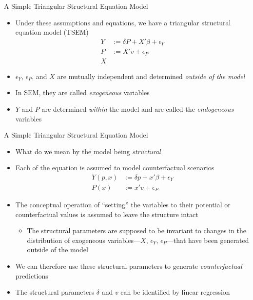\documentclass[aspectratio=1610,12pt,xcolor=dvipsnames]{beamer}
\begin{document}
\begin{frame}{A Simple Triangular Structural Equation Model}
    \begin{itemize}
        \item Under these assumptions and equations, we have a triangular structural equation model (TSEM)
        \begin{align*}
            Y &:= \delta P + X'\beta + \epsilon_Y \\
            P &:= X' v + \epsilon_P \\
            X
        \end{align*}
        \item $\epsilon_Y$, $\epsilon_P$, and $X$ are mutually independent and determined \textit{outside of the model}
        \item In SEM, they are called \textit{exogeneous} variables
        \item $Y$ and $P$ are determined \textit{within} the model and are called the \textit{endogeneous} variables
    \end{itemize}
\end{frame}

\begin{frame}{A Simple Triangular Structural Equation Model}
    \begin{itemize}
        \item What do we mean by the model being \textit{structural}
        \item Each of the equation is assumed to model counterfactual scenarios
        \begin{align*}
            Y(p,x) &:= \delta p + x'\beta + \epsilon_Y \\
            P(x) &:= x' v + \epsilon_P
        \end{align*}
        \item The conceptual operation of ``setting'' the variables to their potential or counterfactual values is assumed to leave the structure intact
        \begin{itemize}
            \item The structural parameters are supposed to be invariant to changes in the distribution of exogeneous variables—$X$, $\epsilon_Y$, $\epsilon_P$—that have been generated outside of the model
        \end{itemize}
        \item We can therefore use these structural parameters to generate \textit{counterfactual} predictions
        \item The structural parameters $\delta$ and $v$ can be identified by linear regression
    \end{itemize}
\end{frame}
\end{document}
